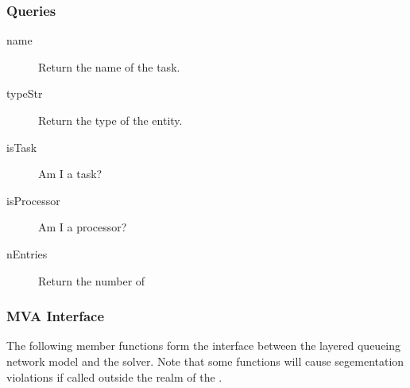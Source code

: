 \subsubsection{Queries}

\begin{description}
\item[name] \texonly{---} Return the name of the task.\\

\item[typeStr] \texonly{---} Return the type of the entity.\\

\item[isTask] \texonly{---} Am I a task?\\

\item[isProcessor] \texonly{---} Am I a processor?\\

\item[nEntries] \texonly{---} Return the number of \\

\end{description}

\subsubsection{MVA Interface}

The following member functions form the interface between the layered
queueing network model and the  solver.  Note that
some functions will cause segementation violations if called outside
the realm of the .

